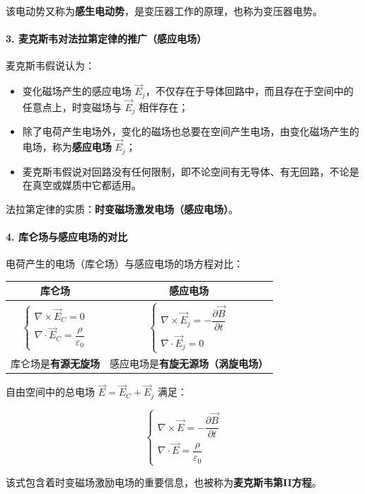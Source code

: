 该电动势又称为\textbf{感生电动势}，是变压器工作的原理，也称为变压器电势。

\paragraph{3. 麦克斯韦对法拉第定律的推广（感应电场）}
麦克斯韦假说认为：
\begin{itemize}
    \item 变化磁场产生的感应电场 $\vec{E}_j$，不仅存在于导体回路中，而且存在于空间中的任意点上，时变磁场与 $\vec{E}_j$ 相伴存在；
    \item 除了电荷产生电场外，变化的磁场也总要在空间产生电场，由变化磁场产生的电场，称为\textbf{感应电场} $\vec{E}_j$；
    \item 麦克斯韦假说对回路没有任何限制，即不论空间有无导体、有无回路，不论是在真空或媒质中它都适用。
\end{itemize}

法拉第定律的实质：\textbf{时变磁场激发电场（感应电场）}。

\paragraph{4. 库仑场与感应电场的对比}
电荷产生的电场（库仑场）与感应电场的场方程对比：
\begin{center}
\begin{tabular}{|c|c|}
\hline
\textbf{库仑场} & \textbf{感应电场} \\
\hline
$\begin{cases}
\nabla \times \vec{E}_C = 0 \\
\nabla \cdot \vec{E}_C = \dfrac{\rho}{\varepsilon_0}
\end{cases}$
&
$\begin{cases}
\nabla \times \vec{E}_j = -\dfrac{\partial \vec{B}}{\partial t} \\
\nabla \cdot \vec{E}_j = 0
\end{cases}$ \\
\hline
库仑场是\textbf{有源无旋场} & 感应电场是\textbf{有旋无源场（涡旋电场）} \\
\hline
\end{tabular}
\end{center}

自由空间中的总电场 $\vec{E} = \vec{E}_C + \vec{E}_j$ 满足：
\begin{formulaBox}
\[
\begin{cases}
\nabla \times \vec{E} = -\dfrac{\partial \vec{B}}{\partial t} \\
\nabla \cdot \vec{E} = \dfrac{\rho}{\varepsilon_0}
\end{cases}
\]
\end{formulaBox}
该式包含着时变磁场激励电场的重要信息，也被称为\textbf{麦克斯韦第II方程}。

